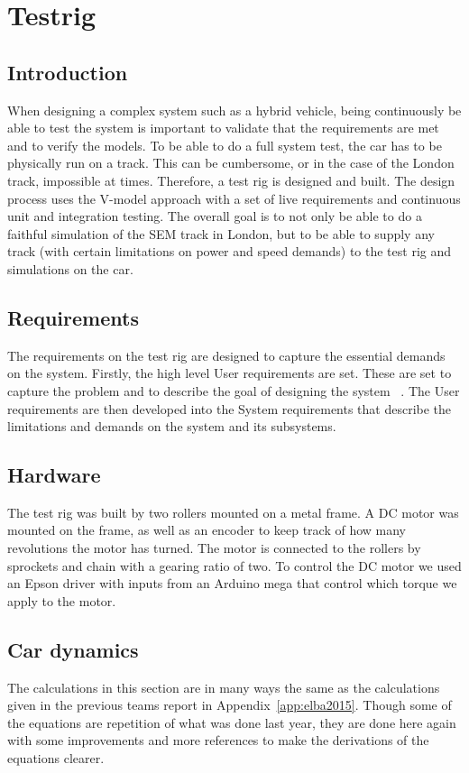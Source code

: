 \chapter{Testrig}
\section{Introduction}
When designing a complex system such as a hybrid vehicle, being continuously be
able to test the system is important to validate that the requirements are met
and to verify the models. To be able to do a full system test, the car has to be
physically run on a track. This can be cumbersome, or in the case of the London
track, impossible at times. Therefore, a test rig is designed and built. The
design process uses the V-model approach with a set of live requirements and
continuous unit and integration testing. The overall goal is to not only be able
to do a faithful simulation of the SEM track in London, but to be able to
supply any track (with certain limitations on power and speed demands) to the
test rig and simulations on the car.

\section{Requirements}
The requirements on the test rig are designed to capture the essential demands
on the system. Firstly, the high level User requirements are set. These are set
to capture the problem and to describe the goal of designing the system
~\cite{ibm_req}. The User requirements are then developed into the System
requirements that describe the limitations and demands on the system and its
subsystems.

\section{Hardware}
The test rig was built by two rollers mounted on a metal frame. A DC motor was mounted on the frame, as well as an encoder to keep track of how many revolutions the motor has turned. The motor is connected to the rollers by sprockets and chain with a gearing ratio of two. To control the DC motor we used an Epson driver with inputs from an Arduino mega that control which torque we apply to the motor. 

\section{Car dynamics} \label{sec:cardynamics}
The calculations in this section are in many ways the same as the calculations
given in the previous teams report in Appendix~\ref{app:elba2015}. Though some
of the equations are repetition of what was done last year, they are
done here again with some improvements and more references to make the
derivations of the equations clearer. 

